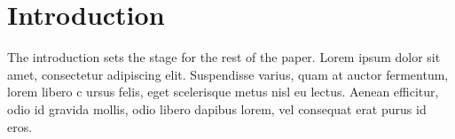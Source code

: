 \section{Introduction}
The introduction sets the stage for the rest of the paper. Lorem ipsum dolor sit amet, 
consectetur adipiscing elit. Suspendisse varius, quam at auctor fermentum, lorem libero c
ursus felis, eget scelerisque metus nisl eu lectus. Aenean efficitur, odio id gravida mollis, 
odio libero dapibus lorem, vel consequat erat purus id eros. 